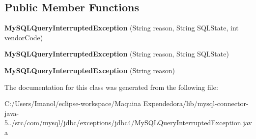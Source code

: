 \subsection*{Public Member Functions}
\begin{DoxyCompactItemize}
\item 
\mbox{\label{classcom_1_1mysql_1_1jdbc_1_1exceptions_1_1jdbc4_1_1_my_s_q_l_query_interrupted_exception_a557a83bbe17c895e7c9ef051541f027a}} 
{\bfseries My\+S\+Q\+L\+Query\+Interrupted\+Exception} (String reason, String S\+Q\+L\+State, int vendor\+Code)
\item 
\mbox{\label{classcom_1_1mysql_1_1jdbc_1_1exceptions_1_1jdbc4_1_1_my_s_q_l_query_interrupted_exception_a8390866a78718a7793e55aba63b2e035}} 
{\bfseries My\+S\+Q\+L\+Query\+Interrupted\+Exception} (String reason, String S\+Q\+L\+State)
\item 
\mbox{\label{classcom_1_1mysql_1_1jdbc_1_1exceptions_1_1jdbc4_1_1_my_s_q_l_query_interrupted_exception_a899018a6b5e02e5bb856c1f32f39e0e6}} 
{\bfseries My\+S\+Q\+L\+Query\+Interrupted\+Exception} (String reason)
\end{DoxyCompactItemize}


The documentation for this class was generated from the following file\+:\begin{DoxyCompactItemize}
\item 
C\+:/\+Users/\+Imanol/eclipse-\/workspace/\+Maquina Expendedora/lib/mysql-\/connector-\/java-\/5../src/com/mysql/jdbc/exceptions/jdbc4/My\+S\+Q\+L\+Query\+Interrupted\+Exception.\+java\end{DoxyCompactItemize}

